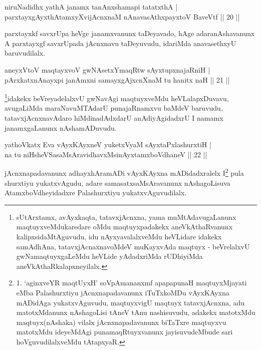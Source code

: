 
\begin{shl}
niruNadidhx yathA janamx tanAnxshamapi tatatxthA |\\
parxtayxgAyxthAtamxyXvijAcnxnaM nAnavasAthx\s payxtoV BaveVtf \hfill || 20 ||
\end{shl}

\begin{artha}
parxtayxkf savxrUpa heVge janamxvanunx taDeyavado, hAge adaranAshavanunx A parxtayxgf 
savxrUpada jAcnxnavu taDeyuvudu, idariMda anavasethxyU baruvudilalx.
\end{artha}

\begin{shl}
aneyxV\s toV maqtayxvoV gwNAsetxYmaqRtw sAyxtupxnajaRniH |\\
pArxkatxnAnayxpi janAmxni samayxgAjxcnXnaM tu hanitx naH \hfill || 21 ||
\end{shl}

\begin{artha}
\footnote{sUtArxtamx, avAyxkaqta, tatavxjAcnxna, yama muMtAdavugaLanunx 
maqtuyxveMdukaredare oMdu maqtuyxpadakekx aneVkAthaRvanunx kalipxsidaMtAguvudu, idu 
nAyxyavalalxveMdu heVLidare idakekx samAdhAna, tatavxjAcnaxnavoMdeV muKayxvAda maqtuyx -   
beVrelalxvU gwNamaqtuyxgaLeMdu heVLide yAdadxriMda rUDhiyiMda 
aneVkAthaRkalapxneyilalx.}idakekx beVreyadelalxvU gwNavAgi maqtuyxveMdu heVLalapxDuvavu, avugaLiMda maraNavuMTAdarU 
punajaRnamxvu baMdeV baruvudu, tatavxjAcnxnavAdaro hiMdinadAdxdarU anAdiyAgidadxrU I namamx 
janamxgaLanunx nAshamADuvudu.
\end{artha}

\begin{shl}
yathoVkatx Eva vAyxKAyxneV yuketxVyaM sAyxtaPxlashurxtiH |\\
na tu niHsheVSasaMsAravidhavxMsinAyxtamxboVdhaneV \hfill || 22 ||
\end{shl}

\begin{artha}
jAcnxnapadavanunx adhayxhAramADi vAyxKAyxna mADidadxralelx I\footnote{1. `aginxveYR maqtUyxH' soV\s pAmananxmf apapapunaH maqtuyxMjayati eMba Palashurxtiyu jAcnxnapadavanunx iTuTxkoMDu vAyxKAyxna mADidAga yukatxvAguvudu, maqtuyxvigU maqtuyx tatavxjAcnxna, adu matotxMdanunx nAshagoLisi tAneV tAnu nashisuvudu, adakekx matotxMdu maqtuyx(nAshaka) vilalx jAcnxnapadavanunx biTaTxre maqtuyxvu matotxMdu ideyeMdAgi punamaqRtuyxvanunx jayisuvudeMbude sari hoVguvudilalxveMdu tAtapxyaR.} pula shurxtiyu yukatxvAgudu, adare samasatxsaMsAravanunx nAshagoLisuva AtamxboVdheyidadxre Palashurxtiyu yukatxvAguvudilalx.
\end{artha}

